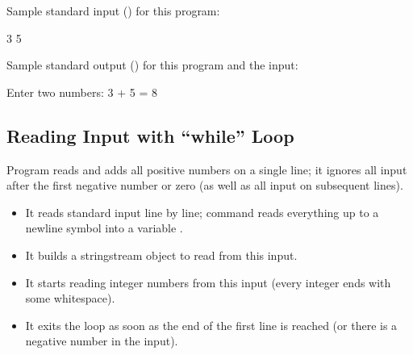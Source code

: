\documentclass[letterpaper,10pt,english,openany,oneside]{sphinxmanual}
\begin{document}
\sphinxAtStartPar
Sample standard input () for this program:

\begin{sphinxVerbatim}[commandchars=\\\{\}]
3 5
\end{sphinxVerbatim}

\sphinxAtStartPar
Sample standard output () for this program and the input:

\begin{sphinxVerbatim}[commandchars=\\\{\}]
Enter two numbers:
3 + 5 = 8
\end{sphinxVerbatim}


\subsection{Reading Input with “while” Loop}
\label{\detokenize{constructs-week01:reading-input-with-while-loop}}
\sphinxAtStartPar
Program  reads and adds all positive numbers on a single line; it ignores all input
after the first negative number or zero (as well as all input on subsequent lines).
\begin{itemize}
\item {} 
\sphinxAtStartPar
It reads standard input line by line; command  reads everything up to a newline symbol into
a  variable .

\item {} 
\sphinxAtStartPar
It builds  a string\sphinxhyphen{}stream object  to read from this input.

\item {} 
\sphinxAtStartPar
It starts reading integer numbers from this input (every integer ends with some whitespace).

\item {} 
\sphinxAtStartPar
It exits the loop as soon as the end of the first line is reached (or there is a negative number in the input).

\end{itemize}
\end{document}
